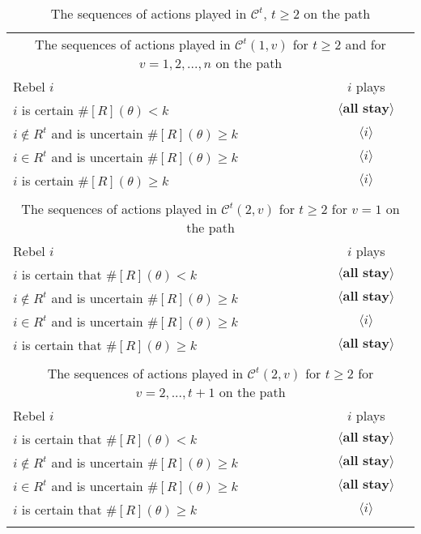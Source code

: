 \documentclass[12pt,letter]{article}
\newcommand{\Kappa}{\mathcal{C}}
\theoremstyle{definition}
\theoremstyle{remark}
\theoremstyle{claim}
\begin{document}
\begin{table}[!htbp]
\caption{The sequences of actions played in $\Kappa^t$, $t\geq 2$ on the path}
\label{Table_cdt}
\begin{center}
\begin{tabular}{l c}
\multicolumn{2}{c}{The sequences of actions played in $\Kappa^t(1,v)$ for $t\geq 2$ and for $v=1,2,...,n$ on the path}\\
Rebel $i$ 	 	&  	$i$ plays		 \\
\hline
\hline
$i$ is certain $\#[R](\theta)<k$ 	& 	$\langle \textbf{all stay} \rangle$	\\
$i\notin R^{t}$ and is uncertain $\#[R](\theta)\geq k$	& 	$\langle i \rangle$	\\
$i\in R^{t}$ and is uncertain $\#[R](\theta)\geq k$ &  $\langle i \rangle$  \\
$i$ is certain $\#[R](\theta)\geq k$ &  $\langle i \rangle$  \\
\hline
\\
\multicolumn{2}{c}{The sequences of actions played in $\Kappa^t(2,v)$ for $t\geq 2$ for $v=1$ on the path}\\
Rebel $i$ 	 	&  	$i$ plays		 \\
\hline
\hline
$i$ is certain that $\#[R](\theta)<k$ 	& 	$\langle \textbf{all stay} \rangle$	\\
$i\notin R^{t}$ and is uncertain $\#[R](\theta)\geq k$	& 	$\langle \textbf{all stay} \rangle$	\\
$i\in R^{t}$ and is uncertain $\#[R](\theta)\geq k$ &  $\langle i \rangle$  \\
$i$ is certain that $\#[R](\theta)\geq k$ &  $\langle \textbf{all stay} \rangle$  \\
\hline
\\
\multicolumn{2}{c}{The sequences of actions played in $\Kappa^t(2,v)$ for $t\geq 2$ for $v=2,...,t+1$ on the path}\\
Rebel $i$ 	 	&  	$i$ plays		 \\
\hline
\hline
$i$ is certain that $\#[R](\theta)<k$ 	& 	$\langle \textbf{all stay} \rangle$	\\
$i\notin R^{t}$ and is uncertain $\#[R](\theta)\geq k$	& 	$\langle \textbf{all stay} \rangle$	\\
$i\in R^{t}$ and is uncertain $\#[R](\theta)\geq k$ &  $\langle \textbf{all stay} \rangle$  \\
$i$ is certain that $\#[R](\theta)\geq k$ &  $\langle i \rangle$  \\
\hline
\\

\end{tabular}
\end{center}
\end{table}
\end{document}
